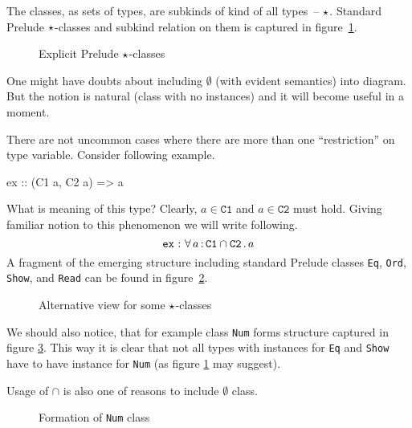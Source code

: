 \documentclass[11pt,oneside,draft]{fithesis2}
\newcommand\uv[1]{``#1''}
\theoremstyle{definition}
\newtheorem{example}{Example}
\begin{document}
The classes, as sets of types, are subkinds of kind of all types~-- \({\star}\).
Standard Prelude \({\star}\)-classes and subkind relation on them is
captured in figure~\ref{diagram:kinds_star1}.
\noindent
\begin{figure}
	\centering
	\scalebox{0.9}{}
	\caption[Explicit Prelude \uv{star} classes]{Explicit Prelude \({\star}\)-classes}
	\label{diagram:kinds_star1}
\end{figure}
One might have doubts about including \(\emptyset\) (with evident semantics) into diagram.
But the notion is natural (class with no instances) and it will become useful in a moment.

There are not uncommon cases where there are more than one \uv{restriction} on type variable.
Consider following example.
\begin{code}
ex :: (C1 a, C2 a) => a
\end{code}
What is meaning of this type? Clearly, \( a \in \texttt{C1} \) and \( a \in \texttt{C2} \) must hold.
Giving familiar notion to this phenomenon we will write following.
\[ \texttt{ex} ~{:}~ \forall \, a \,{:}\, \texttt{C1} \cap \texttt{C2} \,.\, a \]
A fragment of the emerging structure including standard Prelude classes \texttt{Eq}, \texttt{Ord}, \texttt{Show}, and \texttt{Read}
can be found in figure~\ref{diagram:kinds_star2}.


\noindent
\begin{figure}
	\centering
	\scalebox{1.0}{}
	\caption[Alternative view for some \uv{star} classes]{Alternative view for some \({\star}\)-classes}
	\label{diagram:kinds_star2}
\end{figure}

We should also notice, that for example class \texttt{Num} forms structure
captured in figure \ref{diagram:num_intersection}. This way it is clear
that not all types with instances for \texttt{Eq} and \texttt{Show}
have to have instance for \texttt{Num} (as figure \ref{diagram:kinds_star1} may suggest).

Usage of \(\cap\) is also one of reasons to include \(\emptyset\) class.

\noindent
\begin{figure}
	\centering
	\scalebox{1.0}{}
	\caption[Formation of Num class]{Formation of \texttt{Num} class}
	\label{diagram:num_intersection}
\end{figure}
\end{document}
